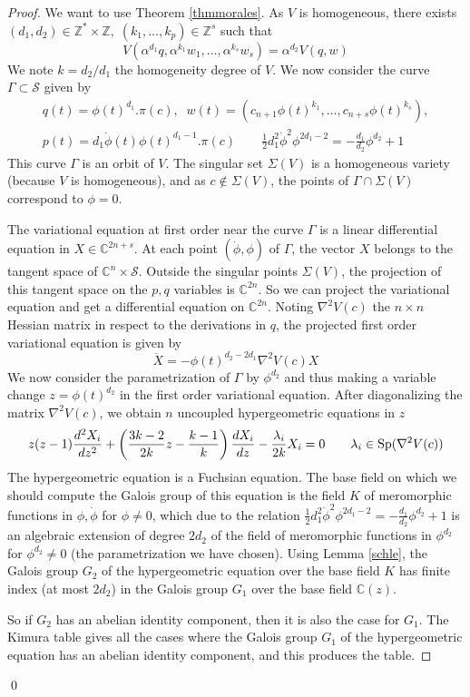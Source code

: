 \documentclass[smallcondensed]{svjour3}
\begin{document}
\begin{proof}
We want to use Theorem \ref{thmmorales}. As $V$ is homogeneous, there exists $(d_1,d_2)\in\mathbb{Z}^*\times\mathbb{Z},\;(k_1,\dots,k_p)\in\mathbb{Z}^s$ such that
$$V(\alpha^{d_1} q,\alpha^{k_1} w_1,\dots,\alpha^{k_s}w_s)=\alpha^{d_2} V(q,w)$$
We note $k=d_2/d_1$ the homogeneity degree of $V$. We now consider the curve $\Gamma\subset \mathcal{S}$ given by
\begin{align*}
q(t)=\phi(t)^{d_1}.\pi(c),\;\; w(t)=(c_{n+1}\phi(t)^{k_1},\dots,c_{n+s}\phi(t)^{k_s}),\\
p(t)=d_1\dot{\phi}(t)\phi(t)^{d_1-1}.\pi(c) \qquad \textstyle{\frac{1}{2}}d_1^2\dot{\phi}^2\phi^{2d_1-2}=-\frac{d_1}{d_2}\phi^{d_2}+1
\end{align*}
This curve $\Gamma$ is an orbit of $V$. The singular set $\Sigma(V)$ is a homogeneous variety (because $V$ is homogeneous), and as $c\notin \Sigma(V)$, the points of $\Gamma\cap \Sigma(V)$ correspond to $\phi=0$.

The variational equation at first order near the curve $\Gamma$ is a linear differential equation in $X\in\mathbb{C}^{2n+s}$. At each point $(\dot{\phi},\phi)$ of $\Gamma$, the vector $X$ belongs to the tangent space of $\mathbb{C}^n\times\mathcal{S}$. Outside the singular points $\Sigma(V)$, the projection of this tangent space on the $p,q$ variables is $\mathbb{C}^{2n}$. So we can project the variational equation and get a differential equation on $\mathbb{C}^{2n}$. Noting $\nabla^2 V(c)$ the $n\times n$ Hessian matrix in respect to the derivations in $q$, the projected first order variational equation is given by
$$\ddot{X}=-\phi(t)^{d_2-2d_1} \nabla^2 V(c) X$$
We now consider the parametrization of $\Gamma$ by $\phi^{d_2}$ and thus making a variable change $z=\phi(t)^{d_2}$ in the first order variational equation. After diagonalizing the matrix $\nabla^2V(c)$, we obtain $n$ uncoupled hypergeometric equations in $z$
$$z(z-1)\frac{d^2X_i}{dz^2}+\left(\frac{3k-2}{2k}z-\frac{k-1}{k}\right) \frac{dX_i}{dz}-\frac{\lambda_i}{2k} X_i=0 \qquad \lambda_i\in\hbox{Sp}(\nabla^2 V(c))$$
The hypergeometric equation is a Fuchsian equation. The base field on which we should compute the Galois group of this equation is the field $K$ of meromorphic functions in $\phi,\dot{\phi}$ for $\phi\neq 0$, which due to the relation $\textstyle{\frac{1}{2}}d_1^2\dot{\phi}^2\phi^{2d_1-2}=-\textstyle{\frac{d_1}{d_2}}\phi^{d_2}+1$ is an algebraic extension of degree $2d_2$ of the field of meromorphic functions in $\phi^{d_2}$ for $\phi^{d_2}\neq 0$ (the parametrization we have chosen). Using Lemma \ref{schle}, the Galois group $G_2$ of the hypergeometric equation over the base field $K$ has finite index (at most $2d_2$) in the Galois group $G_1$ over the base field $\mathbb{C}(z)$.

So if $G_2$ has an abelian identity component, then it is also the case for $G_1$. The Kimura table \cite{14} gives all the cases where the Galois group $G_1$ of the hypergeometric equation has an abelian identity component, and this produces the table.
\end{proof}\qed
\end{document}
